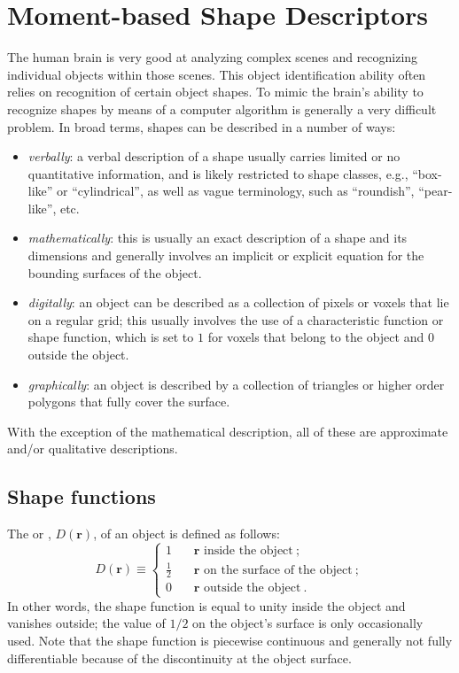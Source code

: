 \section{Moment-based Shape Descriptors}\label{\chabbr:sec:momentshapedescriptors}
The human brain is very good at analyzing complex scenes and recognizing individual objects within those scenes. This object identification ability often relies on recognition of certain object shapes. To mimic the brain's ability to recognize shapes by means of a computer algorithm is generally a very difficult problem.  In broad terms, shapes can be described in a number of ways:
\begin{itemize}
	\item \textit{verbally}: a verbal description of a shape usually carries limited or no quantitative information, and is likely restricted to shape classes, e.g., ``box-like'' or ``cylindrical'', as well as vague terminology, such as  ``roundish'', ``pear-like'', etc. 
	\item \textit{mathematically}: this is usually an exact description of a shape and its dimensions and generally involves an implicit or explicit equation for the bounding surfaces of the object.
	\item \textit{digitally}: an object can be described as a collection of pixels or voxels that lie on a regular grid; this usually involves the use of a characteristic function or shape function, which is set to $1$ for voxels that belong to the object and $0$ outside the object.
	\item \textit{graphically}: an object is described by a collection of triangles or higher order polygons that fully cover the surface.
\end{itemize}
With the exception of the mathematical description, all of these are approximate and/or qualitative descriptions.  

\subsection{Shape functions}\label{\chabbr:ssec:shapefunctions}
The  or , $D(\mathbf{r})$, of an object is defined as follows:
\begin{equation}
	D(\mathbf{r}) \equiv \left\{ \begin{array}{lcl}
	1 & \,& \mathbf{r}\text{ inside the object}\ ;\\
	\frac{1}{2} && \mathbf{r}\text{ on the surface of the object}\ ;\\
	0 & & \mathbf{r}\text{ outside the object}\ .
	\end{array}\right.
\end{equation}
In other words, the shape function is equal to unity inside the object and vanishes outside; the value of $1/2$ on the object's surface is only occasionally used.  Note that the shape function is piecewise continuous and generally not fully differentiable because of the discontinuity at the object surface.

